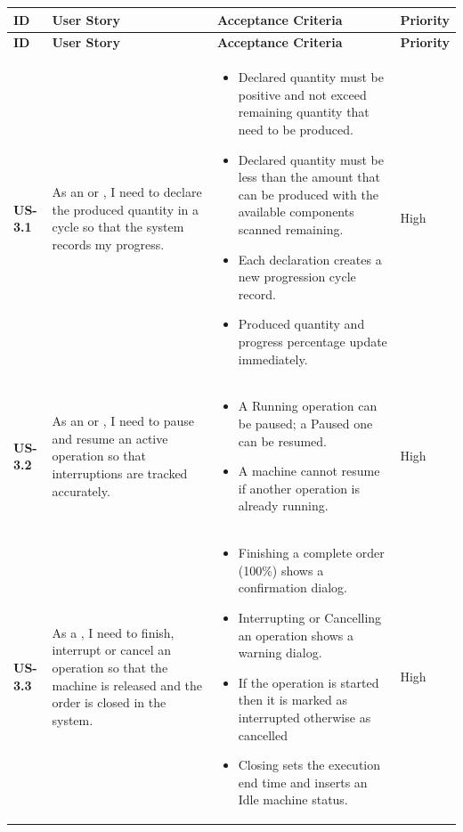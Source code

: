 \begin{longtable}{p{1.5cm} p{5cm} p{6.5cm} p{2cm}}
	\hline
	\textbf{ID} & \textbf{User Story} & \textbf{Acceptance Criteria} & \textbf{Priority} \\
	\hline
	\endfirsthead
	\hline
	\textbf{ID} & \textbf{User Story} & \textbf{Acceptance Criteria} & \textbf{Priority} \\
	\hline
	\endhead
	
	\endlastfoot

	\textbf{US-3.1} &
	As an \userrole{Operator} or \userrole{Supervisor}, I need to declare the
	produced quantity in a cycle so that the system records my progress.
	&
	\begin{itemize}[nosep, leftmargin=*]
	\item Declared quantity must be positive and not exceed remaining quantity that need to be produced.
	\item Declared quantity must be less than the amount that can be produced with the available components scanned remaining.
	\item Each declaration creates a new progression cycle record.
	\item Produced quantity and progress percentage update immediately.
	\end{itemize}
	& High \\ \midrule

	\textbf{US-3.2} &
	As an \userrole{Operator} or \userrole{Supervisor}, I need to pause and
	resume an active operation so that interruptions are tracked accurately.
	&
	\begin{itemize}[nosep, leftmargin=*]
	\item A Running operation can be paused; a Paused one can be resumed.
	\item A machine cannot resume if another operation is already running.
	\end{itemize}
	& High \\ \midrule

	\textbf{US-3.3} &
	As a \userrole{Supervisor}, I need to finish, interrupt or cancel an operation so that
	the machine is released and the order is closed in the system.
	&
	\begin{itemize}[nosep, leftmargin=*]
	\item Finishing a complete order (100\%) shows a confirmation dialog.
	\item Interrupting or Cancelling an operation shows a warning dialog.
	\item If the operation is started then it is marked as interrupted otherwise as cancelled
	\item Closing sets the execution end time and inserts an Idle machine status.
	\end{itemize}
	& High \\ \midrule


\end{longtable}
